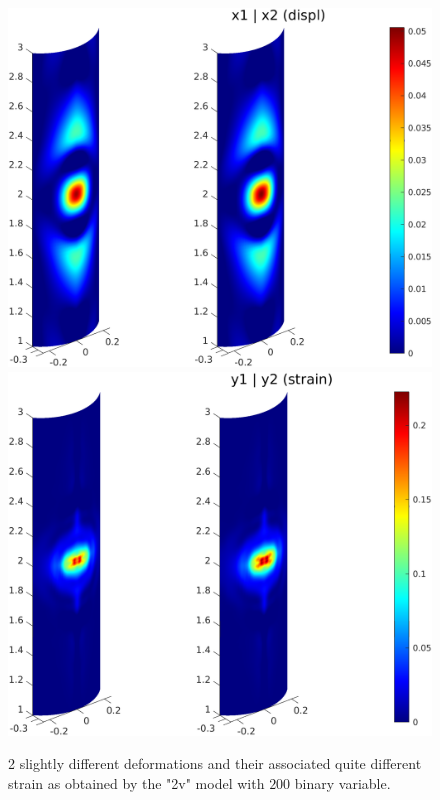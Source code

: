 	\begin{figure}[t!]
\includegraphics[scale=0.5]{deform.png} \hspace{0.8cm}
\includegraphics[scale=0.5]{strain.png}
\caption{2 slightly different deformations and their associated quite different strain as obtained by the "2v" model with $200 $ binary variable.}
\label{fig5}
\end{figure}	


